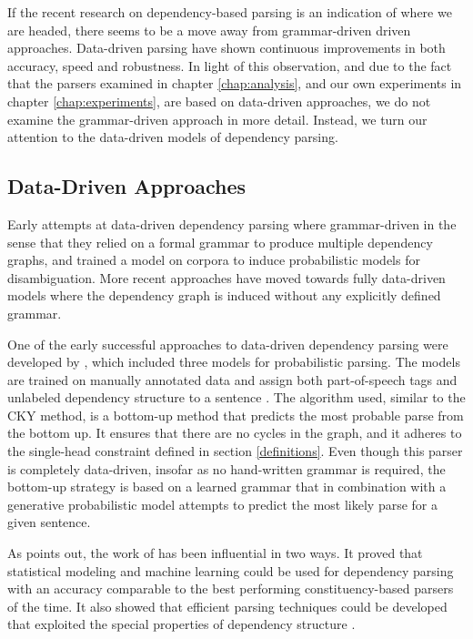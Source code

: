 If the recent research on dependency-based parsing is an indication of where we are headed, there seems to be a move away from grammar-driven driven approaches. Data-driven parsing have shown continuous improvements in both accuracy, speed and robustness. In light of this observation, and due to the fact that the parsers examined in chapter \ref{chap:analysis}, and our own experiments in chapter \ref{chap:experiments}, are based on data-driven approaches, we do not examine the grammar-driven approach in more detail. Instead, we turn our attention to the data-driven models of dependency parsing.

\subsection{Data-Driven Approaches}
\label{data-driven}

Early attempts at data-driven dependency parsing where grammar-driven in the sense that they relied on a formal grammar to produce multiple dependency graphs, and trained a model on corpora to induce probabilistic models for disambiguation. More recent approaches have moved towards fully data-driven models where the dependency graph is induced without any explicitly defined grammar.

One of the early successful approaches to data-driven dependency parsing were developed by \citeauthor{Eisner:96b}, which included three models for probabilistic parsing. The models are trained on manually annotated data and assign both part-of-speech tags and unlabeled dependency structure to a sentence \cite{Eisner:96b}. The algorithm used, similar to the CKY method, is a bottom-up method that predicts the most probable parse from the bottom up. It ensures that there are no cycles in the graph, and it adheres to the single-head constraint defined in section \ref{definitions}. Even though this parser is completely data-driven, insofar as no hand-written grammar is required, the bottom-up strategy is based on a learned grammar that in combination with a generative probabilistic model attempts to predict the most likely parse for a given sentence.

As \citeauthor{Niv:05} points out, the work of \citeauthor{Eisner:96b} has been influential in two ways. It proved that statistical modeling and machine learning could be used for dependency parsing with an accuracy comparable to the best performing constituency-based parsers of the time. It also showed that efficient parsing techniques could be developed that exploited the special properties of dependency structure \cite{Niv:05}.

